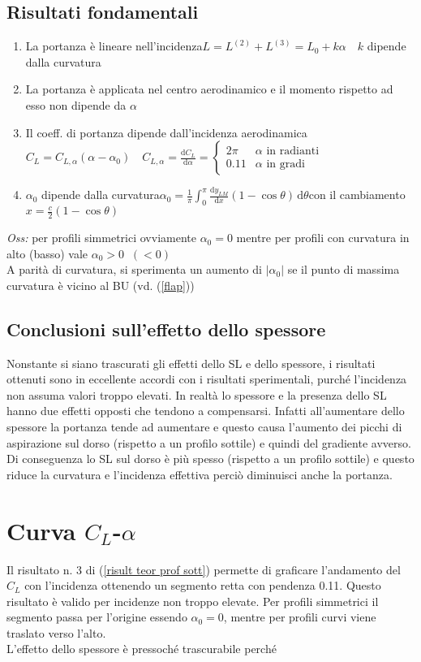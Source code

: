 \documentclass[11pt,a4paper]{report}
\newcommand{\de}{\mathrm d}
\newcommand{\sz}[1]{\scriptsize #1\normalsize}
\begin{document}
		\subsection{Risultati fondamentali}	\label{risult prof sott}
		\begin{enumerate}
			\item{La portanza è lineare nell'incidenza\qquad$L=L^{(2)}+L^{(3)}=L_0+k\alpha\quad k$ dipende dalla curvatura}
			\item{La portanza è applicata nel centro aerodinamico e il momento rispetto ad esso non dipende da $\alpha$}
			\item{Il coeff. di portanza dipende dall'incidenza aerodinamica\qquad$C_L=C_{L,\alpha}(\alpha-\alpha_0)\quad C_{L,\alpha}\!=\!\frac{\de C_L}{\de \alpha}\!=\!\begin{cases}2\pi&\alpha\text{ in radianti}\\0.11&\alpha\text{ in gradi}\end{cases}$}
			\item{$\alpha_0$ dipende dalla curvatura\qquad$\alpha_0=\frac 1\pi\int_0^\pi\frac{\de y_{LM}}{\de x}(1-\cos\theta)\,\de \theta$\quad con il cambiamento $x=\frac c2(1-\cos\theta)$}
	\end{enumerate}
	\textit{Oss:} per profili simmetrici ovviamente $\alpha_0=0$ mentre per profili con curvatura in alto (basso) vale $\alpha_0>0\;\;(<0)$\\A parità di curvatura, si sperimenta un aumento di $|\alpha_0|$ se il punto di massima curvatura è vicino al BU \big(vd. (\ref{flap})\big)\\
		\subsection{Conclusioni sull'effetto dello spessore}
		Nonstante si siano trascurati gli effetti dello SL e dello spessore, i risultati ottenuti sono in eccellente accordi con i risultati sperimentali, purché l'incidenza non assuma valori troppo elevati. In realtà lo spessore e la presenza dello SL hanno due effetti opposti che tendono a compensarsi. Infatti all'aumentare dello spessore la portanza tende ad aumentare e questo causa l'aumento dei picchi di aspirazione sul dorso \sz{(rispetto a un profilo sottile)} e quindi del gradiente avverso. Di conseguenza lo SL sul dorso è più spesso \sz{(rispetto a un profilo sottile)} e questo riduce la curvatura e l'incidenza effettiva perciò diminuisci anche la portanza.

	\section{Curva $C_L$-$\alpha$}
	Il risultato n. 3 di (\ref{risult teor prof sott})  permette di graficare l'andamento del $C_L$ con l'incidenza ottenendo un segmento retta con pendenza 0.11. Questo risultato è valido per incidenze non troppo elevate.
Per profili simmetrici il segmento passa per l'origine essendo $\alpha_0=0$, mentre per profili curvi viene traslato verso l'alto.\\
L'effetto dello spessore è pressoché trascurabile perché 
\end{document}
